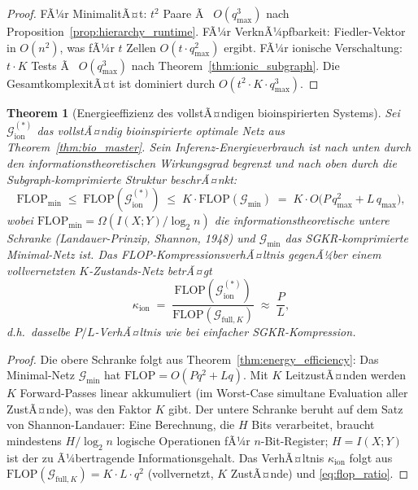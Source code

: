 ﻿\documentclass[12pt, a4paper, openany]{report}
\newtheorem{theorem}{Theorem}[chapter]
\newcommand{\calG}{\mathcal{G}}
\begin{document}
\begin{proof}
FÃ¼r MinimalitÃ¤t: $t^2$ Paare Ã  $O(q_{\max}^3)$ nach Proposition~\ref{prop:hierarchy_runtime}.
FÃ¼r VerknÃ¼pfbarkeit: Fiedler-Vektor in $O(n^2)$, was fÃ¼r $t$ Zellen $O(t \cdot q_{\max}^2)$ ergibt.
FÃ¼r ionische Verschaltung: $t \cdot K$ Tests Ã  $O(q_{\max}^3)$ nach Theorem~\ref{thm:ionic_subgraph}.
Die GesamtkomplexitÃ¤t ist dominiert durch $O(t^2 \cdot K \cdot q_{\max}^3)$.
\end{proof}

\begin{theorem}[Energieeffizienz des vollstÃ¤ndigen bioinspirierten Systems]
\label{thm:bio_energy}
Sei $\calG_{\mathrm{ion}}^{(*)}$ das vollstÃ¤ndig bioinspirierte optimale
Netz aus Theorem~\ref{thm:bio_master}.  Sein Inferenz-Energieverbrauch
ist nach unten durch den informationstheoretischen Wirkungsgrad begrenzt
und nach oben durch die Subgraph-komprimierte Struktur beschrÃ¤nkt:
\begin{equation}
  \label{eq:bio_energy_bound}
  \mathrm{FLOP}_{\min}
  \;\leq\;
  \mathrm{FLOP}(\calG_{\mathrm{ion}}^{(*)})
  \;\leq\;
  K \cdot\mathrm{FLOP}(\calG_{\min})
  \;=\;
  K \cdot O\!\bigl(P\,q_{\max}^2 + L\,q_{\max}\bigr),
\end{equation}
wobei $\mathrm{FLOP}_{\min} = \Omega(I(X;Y) / \log_2 n)$ die
informationstheoretische untere Schranke (Lan\-dauer-Prinzip, Shannon, 1948)
und $\calG_{\min}$ das SGKR-komprimierte Minimal-Netz ist.  Das
FLOP-Kompressions\-ver\-hÃ¤ltnis gegenÃ¼ber einem vollvernetzten
$K$-Zustands-Netz betrÃ¤gt
\begin{equation}
  \label{eq:bio_flop_ratio}
  \kappa_{\mathrm{ion}}
  \;=\;
  \frac{\mathrm{FLOP}(\calG_{\mathrm{ion}}^{(*)})}
       {\mathrm{FLOP}(\calG_{\mathrm{full}, K})}
  \;\approx\;
  \frac{P}{L},
\end{equation}
d.h.\ dasselbe $P/L$-VerhÃ¤ltnis wie bei einfacher SGKR-Kompression.
\end{theorem}

\begin{proof}
Die obere Schranke folgt aus Theorem~\ref{thm:energy_efficiency}: Das
Minimal-Netz $\calG_{\min}$ hat $\mathrm{FLOP} = O(Pq^2 + Lq)$.
Mit $K$ LeitzustÃ¤nden werden $K$ Forward-Passes linear akkumuliert
(im Worst-Case simultane Evaluation aller ZustÃ¤nde), was den Faktor $K$ gibt.
Der untere Schranke beruht auf dem Satz von Shannon-Landauer:
Eine Berechnung, die $H$ Bits verarbeitet, braucht mindestens $H/\log_2 n$
logische Operationen fÃ¼r $n$-Bit-Register;
$H = I(X;Y)$ ist der zu Ã¼bertragende Informationsgehalt.
Das VerhÃ¤ltnis $\kappa_{\mathrm{ion}}$ folgt aus $\mathrm{FLOP}(\calG_{\mathrm{full},K})
= K \cdot L \cdot q^2$ (vollvernetzt, $K$ ZustÃ¤nde) und \eqref{eq:flop_ratio}.
\end{proof}
\end{document}

